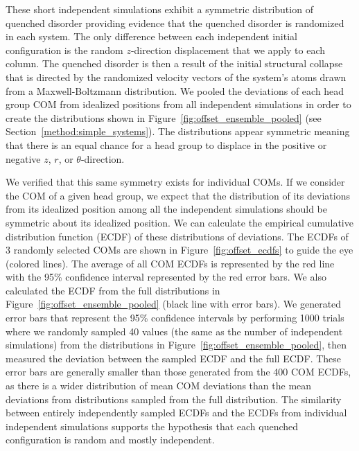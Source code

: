 \documentclass[journal=jpcbfk,manuscript=article]{achemso}
\begin{document}
  These short independent simulations exhibit a symmetric distribution of
  quenched disorder providing evidence that the quenched disorder is randomized
  in each system.  The only difference between each independent initial
  configuration is the random $z$-direction displacement that we apply to each
  column. The quenched disorder is then a result of the initial structural
  collapse that is directed by the randomized velocity vectors of the system's
  atoms drawn from a Maxwell-Boltzmann distribution. We pooled the deviations of
  each head group COM from idealized positions from all independent simulations
  in order to create the distributions shown in
  Figure~\ref{fig:offset_ensemble_pooled} (see
  Section~\ref{method:simple_systems}). The distributions appear symmetric
  meaning that there is an equal chance for a head group to displace in the
  positive or negative $z$, $r$, or $\theta$-direction.

  We verified that this same symmetry exists for individual COMs.  If we
  consider the COM of a given head group, we expect that the distribution of its
  deviations from its idealized position among all the independent simulations
  should be symmetric about its idealized position. We can calculate the
  empirical cumulative distribution function (ECDF) of these distributions of
  deviations. The ECDFs of 3 randomly selected COMs are shown in
  Figure~\ref{fig:offset_ecdfs} to guide the eye (colored lines). The average of
  all COM ECDFs is represented by the red line with the 95\% confidence interval
  represented by the red error bars. We also calculated the ECDF from the full
  distributions in Figure~\ref{fig:offset_ensemble_pooled} (black line with error
  bars). We generated error bars that represent the 95\% confidence intervals by
  performing 1000 trials where we randomly sampled 40 values (the same as the
  number of independent simulations) from the distributions in
  Figure~\ref{fig:offset_ensemble_pooled}, then measured the deviation between
  the sampled ECDF and the full ECDF. These error bars are generally smaller than
  those generated from the 400 COM ECDFs, as there is a wider distribution of
  mean COM deviations than the mean deviations from distributions sampled from
  the full distribution. The similarity between entirely independently sampled
  ECDFs and the ECDFs from individual independent simulations supports the
  hypothesis that each quenched configuration is random and mostly independent.
  
\end{document}
